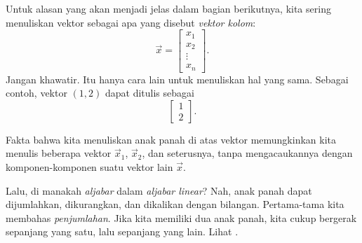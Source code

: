 Untuk alasan yang akan menjadi jelas dalam bagian berikutnya, kita sering
menuliskan vektor sebagai apa yang disebut
\emph{vektor kolom}:
\begin{equation*}
\vec{x} =
\begin{bmatrix}
x_{1} \\ x_2 \\ \vdots \\ x_n
\end{bmatrix} .
\end{equation*}
Jangan khawatir. Itu hanya cara lain untuk menuliskan hal yang sama.
Sebagai contoh, vektor $(1,2)$ dapat ditulis sebagai
\begin{equation*}
\begin{bmatrix}
1 \\ 2
\end{bmatrix} .
\end{equation*}

Fakta bahwa kita menuliskan anak panah di atas vektor memungkinkan kita menulis beberapa
vektor $\vec{x}_1$, $\vec{x}_2$, dan seterusnya, tanpa mengacaukannya dengan
komponen-komponen suatu vektor lain $\vec{x}$.

Lalu, di manakah \emph{aljabar} dalam \emph{aljabar linear}?
Nah, anak panah dapat dijumlahkan, dikurangkan,
dan dikalikan dengan bilangan.
Pertama-tama kita membahas \emph{penjumlahan}.
Jika kita memiliki dua anak panah, kita cukup
bergerak sepanjang yang satu, lalu sepanjang yang lain. Lihat
.

\begin{myfig}
\capstart
{}
\caption{Menjumlahkan vektor $(1,2)$, yang digambar bertitik-titik, dan $(2,-3)$, yang digambar putus-putus.
Hasilnya, $(3,-1)$, digambar sebagai anak panah utuh.\label{linalg-vecadd:fig}}
\end{myfig}

